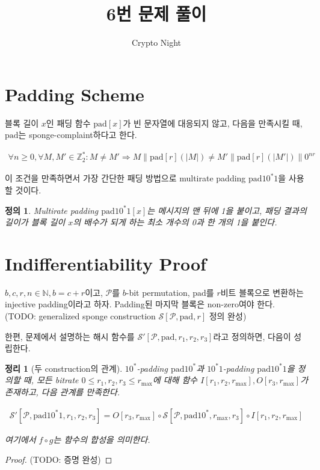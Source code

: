 \documentclass{article}
\title{6번 문제 풀이}
\author{Crypto Night}
\newtheorem{definition}{정의}
\newtheorem{theorem}{정리}
\begin{document}
  \maketitle

  \section{Padding Scheme}
  블록 길이 \(x\)인 패딩 함수 \(\mathrm{pad}[x]\)가 빈 문자열에 대응되지 않고, 다음을 만족시킬 때, \(\mathrm{pad}\)는 sponge-complaint하다고 한다.\cite{guido_cryptographic_2011}

  \begin{align*}
    \forall n \geq 0, \forall M, M' \in \mathbb{Z}^*_2 : M \not=M' \Rightarrow M \| \mathrm{pad}[r](|M|) \not= M' \| \mathrm{pad}[r](|M'|) \| 0^{nr}
  \end{align*}

  이 조건을 만족하면서 가장 간단한 패딩 방법으로 multirate padding \(\mathrm{pad10^*1}\)을 사용할 것이다.

  \begin{definition}
    Multirate padding \(\mathrm{pad10^*1}[x]\)는 메시지의 맨 뒤에 1을 붙이고, 패딩 결과의 길이가 블록 길이 \(x\)의 배수가 되게 하는 최소 개수의 0과 한 개의 1을 붙인다.
  \end{definition}

  \section{Indifferentiability Proof}
  \(b, c, r, n \in \mathbb{N}, b = c + r\)이고, \(\mathcal{P}\)를 \(b\)-bit permutation, \(\mathrm{pad}\)를 \(r\)비트 블록으로 변환하는 injective padding이라고 하자. Padding된 마지막 블록은 non-zero여야 한다.
  (TODO: generalized sponge construction \(\mathcal{S}[\mathcal{P}, \mathrm{pad}, r]\)  정의 완성)

  한편, 문제에서 설명하는 해시 함수를 \(\mathcal{S}'[\mathcal{P}, \mathrm{pad}, r_1, r_2, r_3]\)라고 정의하면, 다음이 성립한다.

  \begin{theorem}[두 construction의 관계]
    \(10^*\)-padding \(\mathrm{pad10^*}\)과 \(10^*1\)-padding \(\mathrm{pad10^*1}\)을 정의할 때, 모든 bitrate \(0 \leq r_1, r_2, r_3 \leq r_\mathrm{max}\)에 대해 함수 \(I[r_1, r_2, r_\mathrm{max}], O[r_3, r_\mathrm{max}]\)가 존재하고, 다음 관계를 만족한다.

    \begin{align*}
      \mathcal{S}'[\mathcal{P}, \mathrm{pad10^*1}, r_1, r_2, r_3] = O[r_3, r_\mathrm{max}] \circ \mathcal{S}[\mathcal{P}, \mathrm{pad10^*}, r_\mathrm{max}, r_3] \circ I[r_1, r_2, r_\mathrm{max}]
    \end{align*}

    여기에서 \(f \circ g\)는 함수의 합성을 의미한다.
  \end{theorem}
  \begin{proof}
    (TODO: 증명 완성)
  \end{proof}
\end{document}
